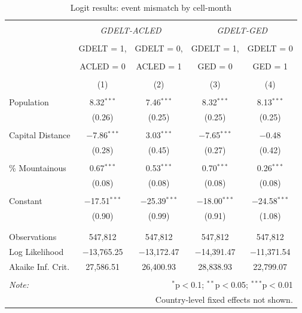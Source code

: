 \documentclass[hidelinks]{article}
\begin{document}
\begin{table}[!htbp] \centering 
  \caption{} 
  \label{} 
\begin{tabular}{@{\extracolsep{5pt}}lcccc} 
\\[-1.8ex]\hline 
\hline \\[-1.8ex] 
 & \multicolumn{2}{c}{\textit{GDELT-ACLED}} & \multicolumn{2}{c}{\textit{GDELT-GED}}\\ 
\cline{2-5} 
\\[-1.8ex] & GDELT = 1, & GDELT = 0, & GDELT = 1, & GDELT = 0 \\ 
\\[-2.8ex] & ACLED = 0 & ACLED = 1 & GED = 0 & GED = 1 \\ 
\\[-1.8ex] & (1) & (2) & (3) & (4)\\ 
\hline \\[-1.8ex] 
 Population & 8.32$^{***}$ & 7.46$^{***}$ & 8.32$^{***}$ & 8.13$^{***}$ \\ 
  & (0.26) & (0.25) & (0.25) & (0.25) \\ 
  & & & & \\ 
 Capital Distance & $-$7.86$^{***}$ & 3.03$^{***}$ & $-$7.65$^{***}$ & $-$0.48 \\ 
  & (0.28) & (0.45) & (0.27) & (0.42) \\ 
  & & & & \\ 
 \% Mountainous & 0.67$^{***}$ & 0.53$^{***}$ & 0.70$^{***}$ & 0.26$^{***}$ \\ 
  & (0.08) & (0.08) & (0.08) & (0.08) \\ 
  & & & & \\ 
 Constant & $-$17.51$^{***}$ & $-$25.39$^{***}$ & $-$18.00$^{***}$ & $-$24.58$^{***}$ \\ 
  & (0.90) & (0.99) & (0.91) & (1.08) \\ 
  & & & & \\ 
\hline \\[-1.8ex] 
Observations & 547,812 & 547,812 & 547,812 & 547,812 \\ 
Log Likelihood & $-$13,765.25 & $-$13,172.47 & $-$14,391.47 & $-$11,371.54 \\ 
Akaike Inf. Crit. & 27,586.51 & 26,400.93 & 28,838.93 & 22,799.07 \\ 
\hline 
\hline \\[-1.8ex] 
\textit{Note:}  & \multicolumn{4}{r}{$^{*}$p$<$0.1; $^{**}$p$<$0.05; $^{***}$p$<$0.01} \\ 
			& \multicolumn{4}{r}{Country-level fixed effects not shown.}
\normalsize 
\end{tabular} 
\caption{Logit results: event mismatch by cell-month}
\end{table} 
\end{document}
